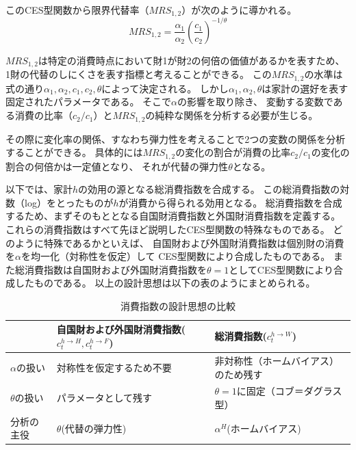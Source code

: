 このCES型関数から限界代替率（\(MRS_{1,2}\)）が次のように導かれる。
\begin{equation}
\label{form:model_households_indices_mrs}
    MRS_{1,2}=\frac{\alpha_1}{\alpha_2}\left(\frac{c_1}{c_2}\right)^{-1/\theta}
\end{equation}

\(MRS_{1,2}\)は特定の消費時点において財1が財2の何倍の価値があるかを表すため、
1財の代替のしにくさを表す指標と考えることができる。
この\(MRS_{1,2}\)の水準は式の通り\(\alpha_1,\alpha_2,c_1,c_2,\theta\)によって決定される。
しかし\(\alpha_1,\alpha_2,\theta\)は家計の選好を表す固定されたパラメータである。
そこで\(\alpha\)の影響を取り除き、
変動する変数である消費の比率（\(c_2/c_1\)）と\(MRS_{1,2}\)の純粋な関係を分析する必要が生じる。

その際に変化率の関係、すなわち弾力性を考えることで2つの変数の関係を分析することができる。
具体的には\(MRS_{1,2}\)の変化の割合が消費の比率\(c_2/c_1\)の変化の割合の何倍かは一定値となり、
それが代替の弾力性\(\theta\)となる。

以下では、家計\(h\)の効用の源となる総消費指数を合成する。
この総消費指数の対数（log）をとったものが\(h\)が消費から得られる効用となる。
総消費指数を合成するため、まずそのもととなる自国財消費指数と外国財消費指数を定義する。
これらの消費指数はすべて先ほど説明したCES型関数の特殊なものである。
どのように特殊であるかといえば、
自国財および外国財消費指数は個別財の消費を\(\alpha\)を均一化（対称性を仮定）して
CES型関数により合成したものである。
また総消費指数は自国財および外国財消費指数を\(\theta=1\)としてCES型関数により合成したものである。
以上の設計思想は以下の表のようにまとめられる。

\begin{table}[H]
    \centering
    \caption{消費指数の設計思想の比較}
    \label{tab:model_households_indices_philosophy}
    \begin{tabular}{lll}
        \toprule
        & 自国財および外国財消費指数(\(c_t^{h\to H},c_t^{h\to F}\)) & 総消費指数(\(c_t^{h\to W}\)) \\
        \midrule
        \(\alpha\)の扱い & 対称性を仮定するため不要 & 非対称性（ホームバイアス）のため残す \\
        \(\theta\)の扱い & パラメータとして残す & \(\theta=1\)に固定（コブ＝ダグラス型） \\
        分析の主役 & \(\theta\)(代替の弾力性) & \(\alpha^H\)(ホームバイアス) \\
        \bottomrule
    \end{tabular}
\end{table}

